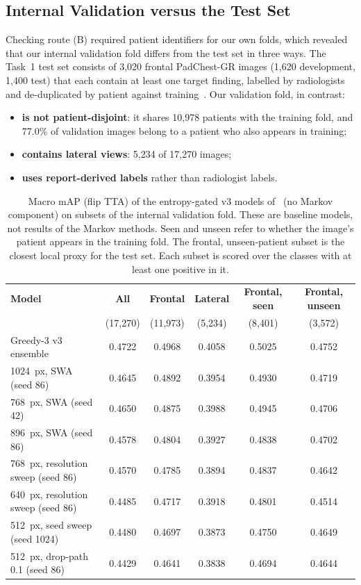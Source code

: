 \documentclass[conference]{IEEEtran}
\begin{document}
\subsection{Internal Validation versus the Test Set}
\label{sec:audit}
Checking route (B) required patient identifiers for our own folds, which revealed that our internal validation fold differs from the test set in three ways. The Task~1 test set consists of 3,020 frontal PadChest-GR images (1,620 development, 1,400 test) that each contain at least one target finding, labelled by radiologists and de-duplicated by patient against training~\cite{b14}. Our validation fold, in contrast:
\begin{itemize}
\item \textbf{is not patient-disjoint}: it shares 10,978 patients with the training fold, and 77.0\% of validation images belong to a patient who also appears in training;
\item \textbf{contains lateral views}: 5,234 of 17,270 images;
\item \textbf{uses report-derived labels} rather than radiologist labels.
\end{itemize}

\begin{table}[htbp]
\caption{Macro mAP (flip TTA) of the entropy-gated v3 models of~\cite{b25} (no Markov component) on subsets of the internal validation fold. These are baseline models, not results of the Markov methods. Seen and unseen refer to whether the image's patient appears in the training fold. The frontal, unseen-patient subset is the closest local proxy for the test set. Each subset is scored over the classes with at least one positive in it.}
\begin{center}
\begin{tabular}{|l|c|c|c|c|c|}
\hline
\textbf{Model} & \textbf{All} & \textbf{Frontal} & \textbf{Lateral} & \textbf{Frontal, seen} & \textbf{Frontal, unseen} \\
 & (17,270) & (11,973) & (5,234) & (8,401) & (3,572) \\
\hline
Greedy-3 v3 ensemble & 0.4722 & 0.4968 & 0.4058 & 0.5025 & 0.4752 \\
\hline
1024~px, SWA (seed 86) & 0.4645 & 0.4892 & 0.3954 & 0.4930 & 0.4719 \\
\hline
768~px, SWA (seed 42) & 0.4650 & 0.4875 & 0.3988 & 0.4945 & 0.4706 \\
\hline
896~px, SWA (seed 86) & 0.4578 & 0.4804 & 0.3927 & 0.4838 & 0.4702 \\
\hline
768~px, resolution sweep (seed 86) & 0.4570 & 0.4785 & 0.3894 & 0.4837 & 0.4642 \\
\hline
640~px, resolution sweep (seed 86) & 0.4485 & 0.4717 & 0.3918 & 0.4801 & 0.4514 \\
\hline
512~px, seed sweep (seed 1024) & 0.4480 & 0.4697 & 0.3873 & 0.4750 & 0.4649 \\
\hline
512~px, drop-path 0.1 (seed 86) & 0.4429 & 0.4641 & 0.3838 & 0.4694 & 0.4644 \\
\hline
\end{tabular}
\label{tab:subsets}
\end{center}
\end{table}
\end{document}
